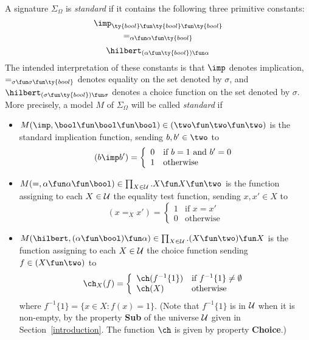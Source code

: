 A signature $\Sigma_{\Omega}$ is {\em standard\/} if it contains the
following three primitive constants:
\[
{\imp}_{\ty{bool}\fun\ty{bool}\fun\ty{bool}}
\]
\[
{=}_{\alpha\fun\alpha\fun\ty{bool}}
\]
\[
\hilbert_{(\alpha\fun\ty{bool})\fun\alpha}
\]
The intended interpretation of these constants is that  $\imp$ denotes
implication, $=_{\sigma\fun\sigma\fun\ty{bool}}$ denotes equality on
the set denoted by $\sigma$, and
$\hilbert_{(\sigma\fun\ty{bool})\fun\sigma}$ denotes a choice function
on the set denoted by $\sigma$. More precisely, a model $M$ of
$\Sigma_{\Omega}$ will be called {\em standard\/} if
\begin{itemize}
 
\item 
$M({\imp},\bool\fun\bool\fun\bool)\in(\two\fun\two\fun\two)$ is the
standard implication function, sending $b,b'\in\two$ to
\[ 
(b\imp b') = \left\{ \begin{array}{ll}
                           0 & \mbox{if $b=1$ and $b'=0$} \\
                           1 & \mbox{otherwise}
                          \end{array}
             \right.%
\]
 
\item 
$M({=},\alpha\fun\alpha\fun\bool)\in\prod_{X\in{\cal U}}.X\fun
X\fun\two$ is the function assigning to each $X\in{\cal U}$ the
equality test function, sending $x,x'\in X$ to
\[ 
(x=_{X}x') = \left\{ \begin{array}{ll}
                           1 & \mbox{if $x=x'$} \\
                           0 & \mbox{otherwise}
                          \end{array}
             \right.%
\]
 
\item 
{}$M(\hilbert,(\alpha\fun\bool)\fun\alpha)\in\prod_{X\in{\cal 
U}}.(X\fun\two)\fun X$ is the function assigning to each $X\in{\cal
U}$ the choice function sending $f\in(X\fun\two)$ to
\[
\ch_{X}(f) = \left\{ \begin{array}{ll}
                           \ch(f^{-1}\{1\})
                             & \mbox{if $f^{-1}\{1\}\not=\emptyset$}\\
                           \ch(X) & \mbox{otherwise}
                          \end{array}
             \right.%
\]
where $f^{-1}\{1\}=\{x\in X : f(x)=1\}$. (Note that $f^{-1}\{1\}$ is in
$\cal U$ when it is non-empty, by the property {\bf Sub} of the
universe $\cal U$ given in Section~\ref{introduction}. The function
$\ch$ is given by property {\bf Choice}.)

\end{itemize}

